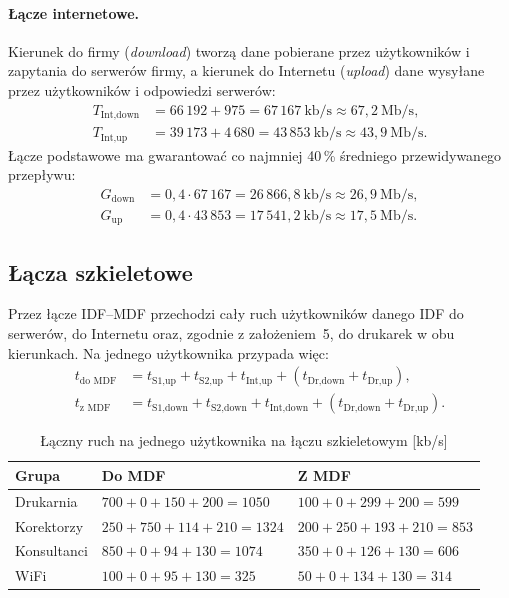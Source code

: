 \documentclass[12pt,a4paper]{article}
\begin{document}
\paragraph{Łącze internetowe.} Kierunek do firmy (\emph{download}) tworzą
dane pobierane przez użytkowników i zapytania do serwerów firmy, a kierunek
do Internetu (\emph{upload}) dane wysyłane przez użytkowników i odpowiedzi
serwerów:
\begin{align*}
T_\text{Int,down} &= 66\,192 + 975    = 67\,167~\text{kb/s} \approx 67{,}2~\text{Mb/s},\\
T_\text{Int,up}   &= 39\,173 + 4\,680 = 43\,853~\text{kb/s} \approx 43{,}9~\text{Mb/s}.
\end{align*}
Łącze podstawowe ma gwarantować co najmniej 40\,\% średniego przewidywanego
przepływu:
\begin{align*}
G_\text{down} &= 0{,}4\cdot67\,167 = 26\,866{,}8~\text{kb/s} \approx 26{,}9~\text{Mb/s},\\
G_\text{up}   &= 0{,}4\cdot43\,853 = 17\,541{,}2~\text{kb/s} \approx 17{,}5~\text{Mb/s}.
\end{align*}

\subsection{Łącza szkieletowe}

Przez łącze IDF--MDF przechodzi cały ruch użytkowników danego IDF do serwerów,
do Internetu oraz, zgodnie z założeniem~5, do drukarek w obu kierunkach. Na
jednego użytkownika przypada więc:
\begin{align*}
t_\text{do MDF} &= t_\text{S1,up} + t_\text{S2,up} + t_\text{Int,up} + (t_\text{Dr,down} + t_\text{Dr,up}),\\
t_\text{z MDF}  &= t_\text{S1,down} + t_\text{S2,down} + t_\text{Int,down} + (t_\text{Dr,down} + t_\text{Dr,up}).
\end{align*}

\begin{table}[htbp]
\centering
\caption{Łączny ruch na jednego użytkownika na łączu szkieletowym [kb/s]}
\label{tab:naosobe}
\begin{tabular}{lll}
\toprule
Grupa & Do MDF & Z MDF \\
\midrule
Drukarnia   & $700 + 0 + 150 + 200 = 1050$   & $100 + 0 + 299 + 200 = 599$ \\
Korektorzy  & $250 + 750 + 114 + 210 = 1324$ & $200 + 250 + 193 + 210 = 853$ \\
Konsultanci & $850 + 0 + 94 + 130 = 1074$    & $350 + 0 + 126 + 130 = 606$ \\
WiFi        & $100 + 0 + 95 + 130 = 325$     & $50 + 0 + 134 + 130 = 314$ \\
\bottomrule
\end{tabular}
\end{table}
\end{document}
